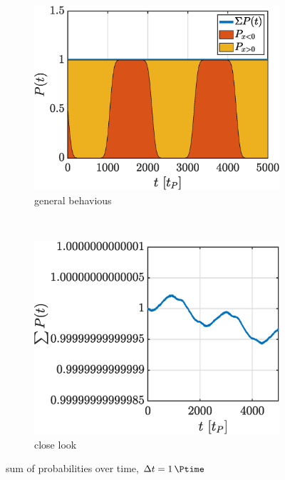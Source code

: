 \documentclass[a4paper,12pt,twoside]{article}
\begin{document}
    \begin{figure}[h]
      \begin{subfigure}[t]{0.45\textwidth}
        \centering
        \includegraphics[width=\textwidth]{graphs/i_ptotcool.eps}
        \caption{general behavious}
        \label{fig:i_ptot_cool}
      \end{subfigure}
      ~
      \begin{subfigure}[t]{0.45\textwidth}
        \centering
        \includegraphics[width=\textwidth]{graphs/i_ptot.eps}
        \caption{close look}
        \label{fig:i_ptot_ugly}
      \end{subfigure}
      \caption{sum of probabilities over time, $\Delta t = \SI{1}{\Ptime}$}
      \label{fig:i_ptot}
    \end{figure}
\end{document}
